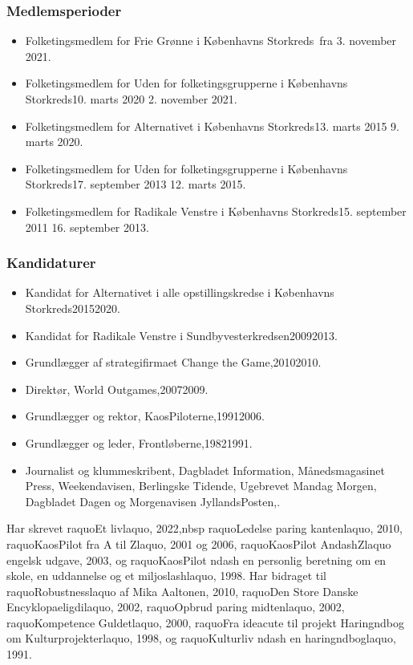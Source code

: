 \documentclass[11pt, a4paper]{awesome-cv}
\begin{document}
\begin{cvletter}
\subsubsection*{Medlemsperioder}
\begin{itemize}
\item Folketingsmedlem for Frie Grønne i Københavns Storkreds fra 3. november 2021.
\item Folketingsmedlem for Uden for folketingsgrupperne i Københavns Storkreds10. marts 2020  2. november 2021.
\item Folketingsmedlem for Alternativet i Københavns Storkreds13. marts 2015  9. marts 2020.
\item Folketingsmedlem for Uden for folketingsgrupperne i Københavns Storkreds17. september 2013  12. marts 2015.
\item Folketingsmedlem for Radikale Venstre i Københavns Storkreds15. september 2011  16. september 2013.
\end{itemize}
\subsubsection*{Kandidaturer}
\begin{itemize}
\item Kandidat for Alternativet i alle opstillingskredse i Københavns Storkreds20152020.
\item Kandidat for Radikale Venstre i Sundbyvesterkredsen20092013.
\end{itemize}
\begin{itemize}
\item Grundlægger af strategifirmaet Change the Game,20102010.
\item Direktør, World Outgames,20072009.
\item Grundlægger og rektor, KaosPiloterne,19912006.
\item Grundlægger og leder, Frontløberne,19821991.
\item Journalist og klummeskribent, Dagbladet Information, Månedsmagasinet Press, Weekendavisen, Berlingske Tidende, Ugebrevet Mandag Morgen, Dagbladet Dagen og Morgenavisen JyllandsPosten,.
\end{itemize}
Har skrevet raquoEt livlaquo, 2022,nbsp raquoLedelse paring kantenlaquo, 2010, raquoKaosPilot fra A til Zlaquo, 2001 og 2006, raquoKaosPilot AndashZlaquo engelsk udgave, 2003, og raquoKaosPilot ndash en personlig beretning om en skole, en uddannelse og et miljoslashlaquo, 1998. Har bidraget til raquoRobustnesslaquo af Mika Aaltonen, 2010, raquoDen Store Danske Encyklopaeligdilaquo, 2002, raquoOpbrud paring midtenlaquo, 2002, raquoKompetence Guldetlaquo, 2000, raquoFra ideacute til projekt  Haringndbog om Kulturprojekterlaquo, 1998, og raquoKulturliv ndash en haringndboglaquo, 1991.

\end{cvletter}
\end{document}

